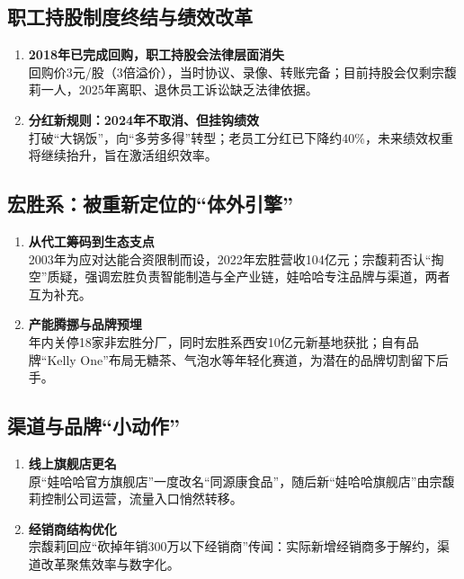 \subsection{职工持股制度终结与绩效改革}
\begin{enumerate}[leftmargin=*, nosep]
    \item \textbf{2018年已完成回购，职工持股会法律层面消失}  \\
    回购价3元/股（3倍溢价），当时协议、录像、转账完备；目前持股会仅剩宗馥莉一人，2025年离职、退休员工诉讼缺乏法律依据。
    \item \textbf{分红新规则：2024年不取消、但挂钩绩效}  \\
    打破“大锅饭”，向“多劳多得”转型；老员工分红已下降约40\%，未来绩效权重将继续抬升，旨在激活组织效率。
\end{enumerate}

\subsection{宏胜系：被重新定位的“体外引擎”}
\begin{enumerate}[leftmargin=*, nosep]
    \item \textbf{从代工筹码到生态支点}  \\
    2003年为应对达能合资限制而设，2022年宏胜营收104亿元；宗馥莉否认“掏空”质疑，强调宏胜负责智能制造与全产业链，娃哈哈专注品牌与渠道，两者互为补充。
    \item \textbf{产能腾挪与品牌预埋}  \\
    年内关停18家非宏胜分厂，同时宏胜系西安10亿元新基地获批；自有品牌“Kelly One”布局无糖茶、气泡水等年轻化赛道，为潜在的品牌切割留下后手。
\end{enumerate}

\subsection{渠道与品牌“小动作”}
\begin{enumerate}[leftmargin=*, nosep]
    \item \textbf{线上旗舰店更名}  \\
    原“娃哈哈官方旗舰店”一度改名“同源康食品”，随后新“娃哈哈旗舰店”由宗馥莉控制公司运营，流量入口悄然转移。
    \item \textbf{经销商结构优化}  \\
    宗馥莉回应“砍掉年销300万以下经销商”传闻：实际新增经销商多于解约，渠道改革聚焦效率与数字化。
\end{enumerate}

